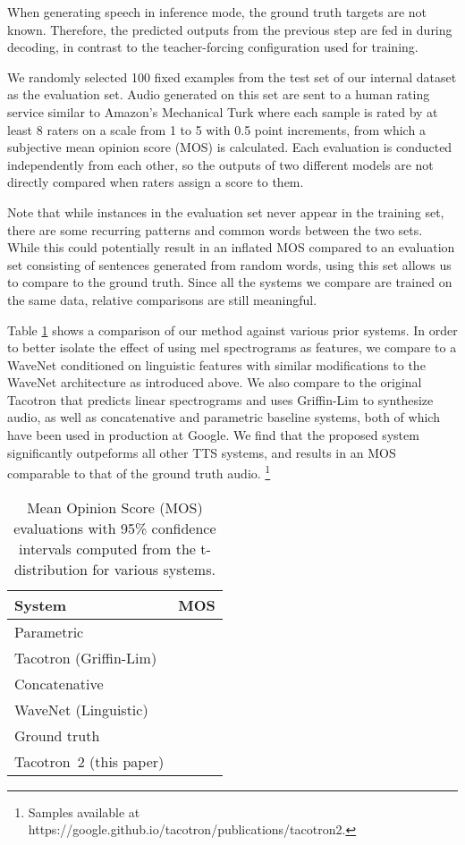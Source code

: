 When generating speech in inference mode, the ground truth targets are
not known.  Therefore, the predicted outputs from the previous step
are fed in during decoding, in contrast to the teacher-forcing
configuration used for training.

We randomly selected 100 fixed examples from the test set of our internal
dataset as the evaluation set.
Audio generated on this set are sent to a human rating service similar to
Amazon's Mechanical Turk where each sample is rated by at least 8 raters on a
scale from 1 to 5 with 0.5 point increments, from which a subjective mean opinion score
(MOS) is calculated. Each evaluation is conducted independently from each other,
so the outputs of two different models are not directly compared when
raters assign a score to them.

Note that while instances in the evaluation set never appear in the training
set, there are some recurring patterns and common words between the two sets.
While this could potentially result in an inflated MOS compared to
an evaluation set consisting of sentences generated from random words, using
this set allows us to compare to the ground truth.  Since all the systems
we compare are trained on the same data, relative comparisons are still
meaningful.

Table \ref{tbl:mos_various_systems} shows
a comparison of our method against various prior systems.
In order to better isolate the effect of using mel spectrograms as features,
we compare to a WaveNet conditioned on linguistic features\cite{45774} with similar
modifications to the WaveNet architecture as introduced above. We also compare
to the original
Tacotron that predicts linear spectrograms and uses Griffin-Lim to synthesize
audio, as well as concatenative \cite{gonzalvo2016recent} and parametric
\cite{zen2016fast} baseline systems, both of which have been used in production at Google.
We find that the proposed system significantly outpeforms all other TTS systems,
and results in an MOS comparable to that of the ground truth audio.
\footnote[2]{Samples available at https://google.github.io/tacotron/publications/tacotron2.}

\begin{table}[H]
  \centering
  \begin{tabular}{lc}
  \toprule
  System                & MOS \\
  \midrule
  Parametric            &    \\
  Tacotron (Griffin-Lim)&    \\
  Concatenative         &    \\
  WaveNet (Linguistic)  &    \\
  Ground truth          &    \\
  \midrule
  Tacotron~2 (this paper)& \bm{}   \\
  \bottomrule
  \end{tabular}
\caption{Mean Opinion Score (MOS) evaluations with 95\% confidence intervals
computed from the t-distribution for various systems.}
\label{tbl:mos_various_systems}
\end{table}

